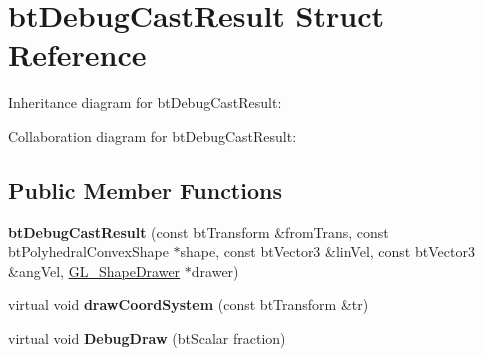 \hypertarget{structbt_debug_cast_result}{\section{bt\+Debug\+Cast\+Result Struct Reference}
\label{structbt_debug_cast_result}
}


Inheritance diagram for bt\+Debug\+Cast\+Result\+:


Collaboration diagram for bt\+Debug\+Cast\+Result\+:
\subsection*{Public Member Functions}
\begin{DoxyCompactItemize}
\item 
\hypertarget{structbt_debug_cast_result_a6d98449d54bb51f4e100695753d79c5a}{{\bfseries bt\+Debug\+Cast\+Result} (const bt\+Transform \&from\+Trans, const bt\+Polyhedral\+Convex\+Shape $\ast$shape, const bt\+Vector3 \&lin\+Vel, const bt\+Vector3 \&ang\+Vel, \hyperlink{class_g_l___shape_drawer}{G\+L\+\_\+\+Shape\+Drawer} $\ast$drawer)}\label{structbt_debug_cast_result_a6d98449d54bb51f4e100695753d79c5a}

\item 
\hypertarget{structbt_debug_cast_result_a2dbd6a8a499a06689612b2e02f98a454}{virtual void {\bfseries draw\+Coord\+System} (const bt\+Transform \&tr)}\label{structbt_debug_cast_result_a2dbd6a8a499a06689612b2e02f98a454}

\item 
\hypertarget{structbt_debug_cast_result_a25ed18d87887d2f0a31d9c5857d86749}{virtual void {\bfseries Debug\+Draw} (bt\+Scalar fraction)}\label{structbt_debug_cast_result_a25ed18d87887d2f0a31d9c5857d86749}

\end{DoxyCompactItemize}
